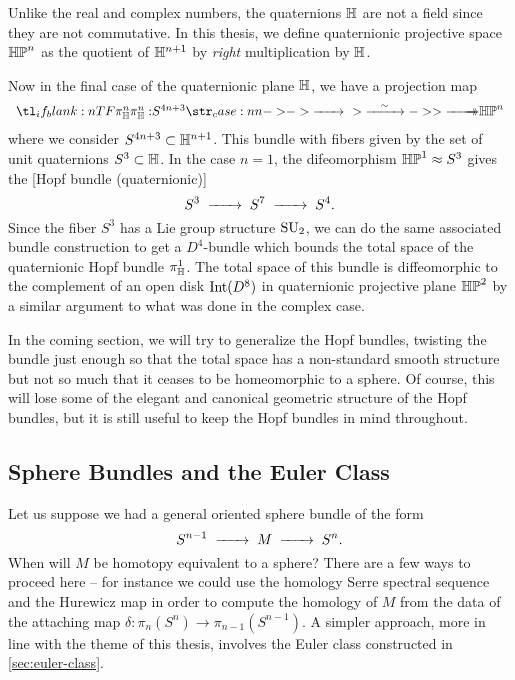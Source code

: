 \begin{remark}
	Unlike the real and complex numbers, the quaternions $\mathbb{H}$ are not a field since they are not commutative. In this thesis, we define quaternionic projective space $\mathbb{HP}^{n}$ as the quotient of $\mathbb{H}^{n+1}$ by \emph{right} multiplication by $\mathbb{H}$.
\end{remark}

Now in the final case of the quaternionic plane $\mathbb{H}$, we have a projection map
\[
	\lkxfunc{\pi_\HH^n}{S^{4n+3}}{\HP^n}
\]
where we consider $S^{4n+3}\subset \mathbb{H}^{n+1}$. This bundle with fibers given by the set of unit quaternions $S^3\subset \mathbb{H}$.
In the case $n=1$, the difeomorphism $\mathbb{HP}^1\approx S^3$ gives the [Hopf bundle (quaternionic)]
\[
	S^3 \lkxto S^7 \lkxto S^4.
\]
Since the fiber $S^3$ has a Lie group structure $\mathrm{SU}_2$, we can do the same associated bundle construction to get a $D^4$-bundle which bounds the total space of the quaternionic Hopf bundle $\pi_{\mathbb{H}}^1$. The total space of this bundle is diffeomorphic to the complement of an open disk $\operatorname{Int}(D^8)$ in quaternionic projective plane $\mathbb{HP}^2$ by a similar argument to what was done in the complex case.

In the coming section, we will try to generalize the Hopf bundles, twisting the bundle just enough so that the total space has a non-standard smooth structure but not so much that it ceases to be homeomorphic to a sphere.
Of course, this will lose some of the elegant and canonical geometric structure of the Hopf bundles, but it is still useful to keep the Hopf bundles in mind throughout.

\subsection{Sphere Bundles and the Euler Class}

Let us suppose we had a general oriented sphere bundle of the form
\begin{equation}\label{eq:general-spherical-fibration}
		S^{n-1}\lkxto M \lkxto S^n.
\end{equation}
When will $M$ be homotopy equivalent to a sphere? There are a few ways to proceed here -- for instance we could use the homology Serre spectral sequence and the Hurewicz map in order to compute the homology of $M$ from the data of the attaching map $\delta : \pi_n(S^n) \to \pi_{n-1}(S^{n-1})$. A simpler approach, more in line with the theme of this thesis, involves the Euler class constructed in \cref{sec:euler-class}.

